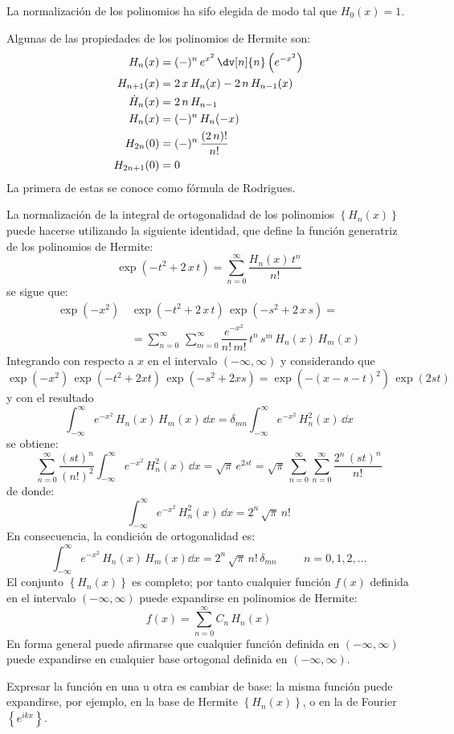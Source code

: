 La normalización de los polinomios ha sifo elegida de modo tal que $H_{0}(x) = 1$.
\par
Algunas de las propiedades de los polinomios de Hermite son:
\begin{align*}
H_{n} (x) &= (-)^{n} \, e^{x^{2}} \, \dv[n]{n} \left( e^{-x^{2}} \right) \\
H_{n+1} (x) &= 2 \, x \, H_{n} (x) - 2 \, n \, H_{n-1} (x) \\
\dot{H}_{n} (x) &= 2 \, n \, H_{n-1} \\
H_{n} (x) &= (-)^{n} \, H_{n} (-x) \\
H_{2n} (0) &= (-)^{n} \, \dfrac{(2 \, n)!}{n!} \\
H_{2n+1} (0) &= 0
\end{align*}
La primera de estas se conoce como fórmula de Rodrigues.
\par
La normalización de la integral de ortogonalidad de los polinomios $\left\{ H_{n} (x) \right\}$ puede hacerse utilizando la siguiente identidad, que define la función generatriz de los polinomios de Hermite:
\[ \exp \left( -t^{2} + 2 \, x \, t \right) = \sum_{n=0}^{\infty} \dfrac{H_{n} (x) \, t^{n}}{n!} \]
se sigue que:
\begin{align*}
\exp \left( -x^{2} \right) \, & \exp \left( -t^{2} + 2 \, x \, t \right) \, \exp \left( -s^{2} + 2 \, x \, s \right) = \\
&= \sum_{n=0}^{\infty} \, \sum_{m=0}^{\infty} \dfrac{e^{-x^{2}}}{n! \, m!} \, t^{n} \, s^{m} \, H_{n} (x) \, H_{m} (x)
\end{align*}
Integrando con respecto a $x$ en el intervalo $(-\infty, \infty)$ y considerando que
\[ \exp \left( -x^{2} \right) \, \exp \left( -t^{2} + 2 x t \right) \, \exp \left( -s^{2} + 2 x s \right) = \exp \left( - (x - s - t)^{2} \right) \, \exp \left( 2 s t \right) \]
y con el resultado
\[ \int_{-\infty}^{\infty} e^{-x^{2}} \, H_{n} (x) \, H_{m} (x) \, \dd x = \delta_{m n} \int_{-\infty}^{\infty} e^{-x^{2}} \, H_{n}^{2} (x) \, \dd x \]
se obtiene:
\[ \sum_{n=0}^{\infty} \dfrac{(s t)^{n}}{(n!)^{2}} \int_{-\infty}^{\infty} e^{-x^{2}} \, H_{n}^{2} (x) \, \dd x = \sqrt{\pi} \, e^{2 s t } = \sqrt{\pi} \, \sum_{n=0}^{\infty} \sum_{n=0}^{\infty} \dfrac{2^{n} \, (s t)^{n}}{n!} \]
de donde:
\[ \int_{-\infty}^{\infty} e^{-x^{2}} \, H_{n}^{2} (x) \, \dd x = 2^{n} \, \sqrt{\pi} \, n! \]
En consecuencia, la condición de ortogonalidad es:
\begin{equation}
\boxed{ \int_{-\infty}^{\infty} e^{-x^{2}} \, H_{n} (x) \, H_{m} (x) \dd x = 2^{n} \, \sqrt{\pi} \, n! \, \delta_{m n} \hspace{1cm} n = 0, 1, 2, \ldots }
\end{equation}
El conjunto $\left\{ H_{n }(x) \right\}$ es completo; por tanto cualquier función $f(x)$ definida en el intervalo $(-\infty, \infty)$ puede expandirse en polinomios de Hermite:
\[ f(x) = \sum_{n=0}^{\infty} C_{n} \, H_{n} (x) \]
En forma general puede afirmarse que cualquier función definida en $(-\infty, \infty)$ puede expandirse en cualquier base ortogonal definida en $(-\infty, \infty)$.
\par
Expresar la función en una u otra es cambiar de base: la misma función puede expandirse, por ejemplo, en la base de Hermite $\left\{ H_{n }(x) \right\}$, o en la de Fourier $\left\{ e^{i k x} \right\}$.
